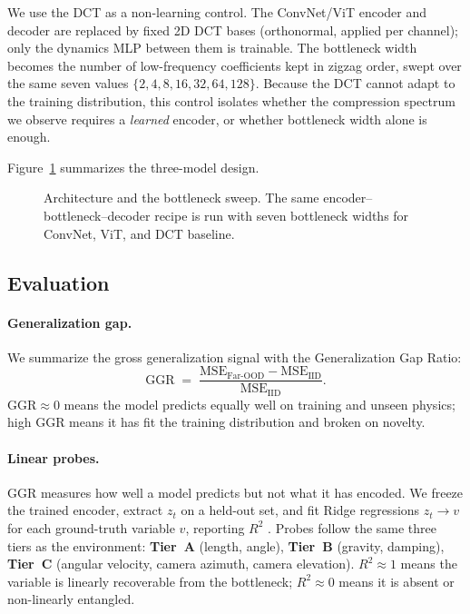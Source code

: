 \documentclass[letterpaper]{article} %
\begin{document}
We use the DCT as a non-learning control. The ConvNet/ViT encoder and decoder are replaced by fixed 2D DCT bases (orthonormal, applied per channel); only the dynamics MLP between them is trainable. The bottleneck width becomes the number of low-frequency coefficients kept in zigzag order, swept over the same seven values $\{2, 4, 8, 16, 32, 64, 128\}$. Because the DCT cannot adapt to the training distribution, this control isolates whether the compression spectrum we observe requires a \emph{learned} encoder, or whether bottleneck width alone is enough.

Figure~\ref{fig:arch} summarizes the three-model design.

\begin{figure}[t]
    \centering
    
    \caption{Architecture and the bottleneck sweep. The same encoder--bottleneck--decoder
    recipe is run with seven bottleneck widths for ConvNet, ViT, and DCT baseline.}
    \label{fig:arch}
\end{figure}

\subsection{Evaluation}
\label{sec:eval}

\paragraph{Generalization gap.}
We summarize the gross generalization signal with the Generalization Gap Ratio:
\[
\mathrm{GGR} \;=\; \frac{\mathrm{MSE}_{\mathrm{Far\text{-}OOD}} - \mathrm{MSE}_{\mathrm{IID}}}{\mathrm{MSE}_{\mathrm{IID}}}.
\]
$\mathrm{GGR}\approx0$ means the model predicts equally well on training and unseen physics; high $\mathrm{GGR}$ means it has fit the training distribution and broken on novelty.

\paragraph{Linear probes.}
GGR measures how well a model predicts but not what it has encoded. We freeze the trained encoder, extract $z_t$ on a held-out set, and fit Ridge regressions $z_t \to v$ for each ground-truth variable $v$, reporting $R^2$ \citep{alain2016understanding}. Probes follow the same three tiers as the environment: \textbf{Tier~A} (length, angle), \textbf{Tier~B} (gravity, damping), \textbf{Tier~C} (angular velocity, camera azimuth, camera elevation). $R^2\approx1$ means the variable is linearly recoverable from the bottleneck; $R^2\approx0$ means it is absent or non-linearly entangled.
\end{document}
